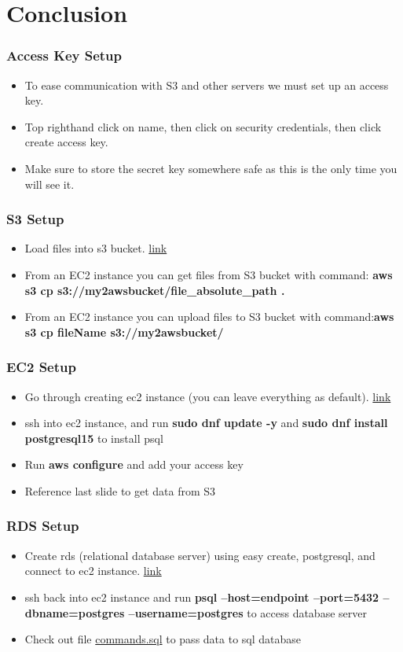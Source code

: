 \documentclass{beamer}
\begin{document}
\section{Conclusion}
\begin{frame}\frametitle{Access Key Setup}
\begin{itemize} 
\item To ease communication with S3 and other servers we must set up an access key.
\item Top righthand click on name, then click on security credentials, then click create access key.
\item Make sure to store the secret key somewhere safe as this is the only time you will see it.
\end{itemize}
\end{frame}


\begin{frame}\frametitle{S3 Setup}
\begin{itemize} 
\item Load files into s3 bucket. \href{https://docs.aws.amazon.com//AmazonS3//latest//userguide//creating-bucket.html}{link}
\item From an EC2 instance you can get files from S3 bucket with command: \textbf{aws s3 cp s3://my2awsbucket/file\_absolute\_path .}
\item From an EC2 instance you can upload files to S3 bucket with command:\textbf{aws s3 cp fileName s3://my2awsbucket/}
\end{itemize}
\end{frame}

    
\begin{frame}\frametitle{EC2 Setup}
\begin{itemize} 
\item Go through creating ec2 instance (you can leave everything as default). \href{https://docs.aws.amazon.com/AmazonRDS/latest/UserGuide/CHAP_GettingStarted.CreatingConnecting.PostgreSQL.html}{link}
\item ssh into ec2 instance, and run \textbf{sudo dnf update -y} and \textbf{sudo dnf install postgresql15} to install psql
\item Run \textbf{aws configure} and add your access key 
\item Reference last slide to get data from S3
\end{itemize}
\end{frame}


\begin{frame}\frametitle{RDS Setup}
\begin{itemize}  
\item Create rds (relational database server) using easy create, postgresql, and connect to ec2 instance. \href{https://docs.aws.amazon.com/AmazonRDS/latest/UserGuide/CHAP_GettingStarted.CreatingConnecting.PostgreSQL.html}{link}
\item ssh back into ec2 instance and run \textbf{psql --host=endpoint --port=5432 --dbname=postgres --username=postgres} to access database server
\item Check out file \href{../commands.sql}{commands.sql} to pass data to sql database
\end{itemize}
\end{frame}
\end{document}
